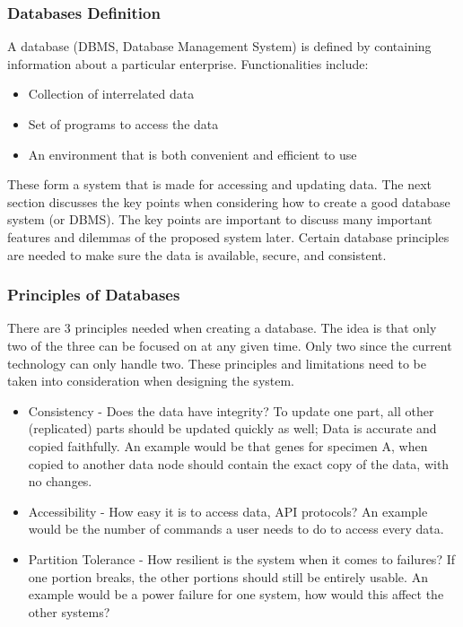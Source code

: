 \documentclass[acmsmall]{acmart}
\begin{document}
\subsubsection{Databases Definition}
A database (DBMS, Database Management System) is defined by containing information about a particular enterprise. Functionalities include: \cite{Silberschatz2010}
\begin{itemize}
    \item Collection of interrelated data
    \item Set of programs to access the data
    \item An environment that is both convenient and efficient to use
\end{itemize}

These form a system that is made for accessing and updating data. The next section discusses the key points when considering how to  create a good database system (or DBMS). The key points are important to discuss many important features and dilemmas of the proposed system later. Certain database principles are needed to make sure the data is available, secure, and consistent. 

\subsubsection{Principles of Databases} 
There are 3 principles needed when creating a database. The idea is that only two of the three can be focused on at any given time. Only two since the current technology can only handle two. These principles and limitations need to be taken into consideration when designing the system. \cite{Silberschatz2010}

\begin{itemize}
    \item Consistency - Does the data have integrity? To update one part, all other (replicated) parts should be updated quickly as well; Data is accurate and copied faithfully. An example would be that genes for specimen A, when copied to another data node should contain the exact copy of the data, with no changes.
    \item Accessibility - How easy it is to access data, API protocols? An example would be the number of commands  a user needs to do to access every data.
    \item Partition Tolerance - How resilient is the system when it comes to failures? If one portion breaks, the other portions should still be entirely usable. An example would be a power failure for one system, how would this affect the other systems?
\end{itemize}
\end{document}
